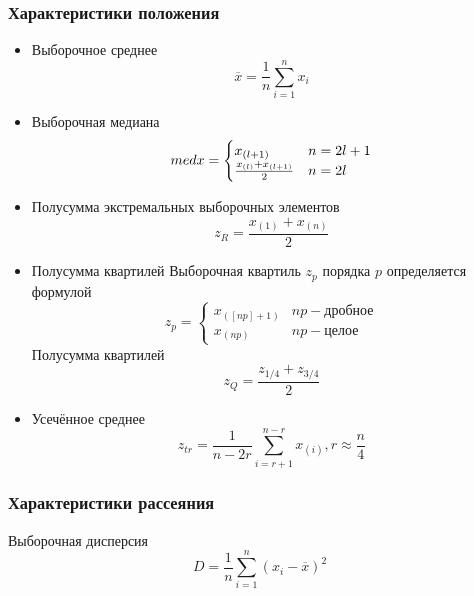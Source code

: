 \documentclass[a4paper]{article}
\begin{document}
\subsubsection{Характеристики положения}
\begin{itemize}
	\item Выборочное среднее 
	\begin{equation} \label{snc:mean}
		\overline{x} = \frac{1}{n}\sum_{i=1}^{n}{x_i}
	\end{equation}
	\item Выборочная медиана 
	\begin{equation} \label{snc:med}
		med x = \begin{cases}
			x_{(l+1)} &\text{$ n=2l+1$}\\
			\frac{x_{(l)} + x_{(l+1)}}{2} &\text{$ n=2l$}
		\end{cases}
	\end{equation}
	\item Полусумма экстремальных выборочных элементов 
	\begin{equation} \label{snc:zR}
		z_R = \frac{x_{(1)} + x_{(n)}}{2}
	\end{equation}
	\item Полусумма квартилей \newline Выборочная квартиль $z_p$ порядка $p$ определяется формулой 
	\begin{equation} \label{snc:zp}
		z_p = \begin{cases}
			x_{([np]+1)} &\text{$np - $дробное}\\
			x_{(np)}&\text{$np - $целое}
		\end{cases}
	\end{equation}
	Полусумма квартилей 
	\begin{equation} \label{snc:zQ}
		z_Q = \frac{z_{1/4} + z_{3/4}}{2}
	\end{equation}
	\item Усечённое среднее
	\begin{equation} \label{snc:ztr}
		z_{tr} = \frac{1}{n-2r}\sum_{i=r+1}^{n-r}{x_{(i)}}, r\approx\frac{n}{4}	  
	\end{equation}
\end{itemize}

\subsubsection{Характеристики рассеяния}
Выборочная дисперсия
\begin{equation} \label{snc:dispersion}
	D = \frac{1}{n}\sum_{i=1}^{n}{(x_i-\overline{x})^2}
\end{equation}
\end{document}
